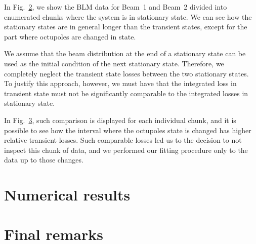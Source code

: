 \begin{figure}
    \centering
    \caption{}
    \label{fig:transient-state}
\end{figure}

In Fig.~\ref{fig:chunks}, we show the BLM data for Beam~1 and Beam~2 divided into enumerated chunks where the system is in stationary state. We can see how the stationary states are in general longer than the transient states, except for the part where octupoles are changed in state.

\begin{figure}
    \centering
    \caption{}
    \label{fig:chunks}
\end{figure}

We assume that the beam distribution at the end of a stationary state can be used as the initial condition of the next stationary state. Therefore, we completely neglect the transient state losses between the two stationary states. To justify this approach, however, we must have that the integrated loss in transient state must not be significantly comparable to the integrated losses in stationary state.

In Fig.~\ref{fig:wire_loss_comp}, such comparison is displayed for each individual chunk, and it is possible to see how the interval where the octupoles state is changed has higher relative transient losses. Such comparable losses led us to the decision to not inspect this chunk of data, and we performed our fitting procedure only to the data up to those changes.

\begin{figure}
    \centering
    \caption{}
    \label{fig:wire_loss_comp}
\end{figure}



\section{Numerical results}

\section{Final remarks}